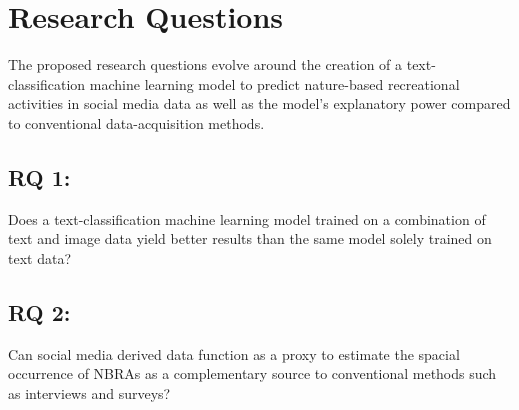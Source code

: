 \chapter{Research Questions} \label{research_questions}
The proposed research questions evolve around the creation of a text-classification machine learning model to predict nature-based recreational activities in social media data as well as the model's explanatory power compared to conventional data-acquisition methods.

\section{RQ 1:}
Does a text-classification machine learning model trained on a combination of text and image data yield better results than the same model solely trained on text data?

\section{RQ 2:}
Can social media derived data function as a proxy to estimate the spacial occurrence of NBRAs as a complementary source to conventional methods such as interviews and surveys?




